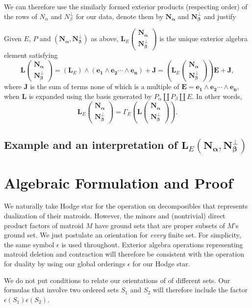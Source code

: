 \documentclass[Unicode]{cedram-alco}
\newcommand{\ext}[1]{\ensuremath{\mathbf{#1}}}
\newcommand{\dunion}{\coprod}
\newcommand{\extLVert}[2]{\ext{L}\left( \begin{array}{c} {#1}\\ {#2} \end{array} \right)}
\newcommand{\extLVertSub}[3]{\ext{L}_{#1}\left( \begin{array}{c} {#2}\\ {#3} \end{array} \right)}
\begin{document}
We can therefore use the similarly formed exterior products
(respecting order) of the rows of $N_\alpha$ and $N_\beta^\perp$
for our data, denote them by 
$\ext{N_\alpha}$ and $\ext{N_\beta^\perp}$
and justify

\begin{defi}
  Given $E$, $P$ and $(\ext{N_\alpha},\ext{N_\beta^\perp})$ as above,
  $\extLVertSub{E}{\ext{N_\alpha}}{\ext{N_\beta^\perp}}$ is the
  unique exterior algebra element satisfying
  \[
  \extLVert{\ext{N_\alpha}}{\ext{N_\beta^\perp}}=
  (\ext{L}_E)\wedge (\ext{e_1}\wedge\ext{e_2}\cdots\wedge\ext{e_n}) + \ext{J} =
  (\extLVertSub{E}{\ext{N_\alpha}}{\ext{N_\beta^\perp}})\ext{E}+\ext{J},
  \]
where $\ext{J}$ is the sum of terms none of which is a multiple of
$\ext{E}=\ext{e_1}\wedge\ext{e_2}\cdots\wedge\ext{e_n}$, when
$\ext{L}$ is expanded using the basis generated by $P_\alpha \dunion
P_\beta \dunion E$.  In other words,
  \[ 
  \extLVertSub{E}
              {\ext{N_\alpha}}
              {\ext{N_\beta^\perp}}
              =
              \Gamma_E(
              \extLVert{\ext{N_\alpha}}{\ext{N_\beta^\perp}}).
  \]
\end{defi}


\subsection{Example and an interpretation of $\ext{L}_E(\ext{N_\alpha},\ext{N_\beta^\perp})$}\label{ExamK4}






\section{Algebraic Formulation and Proof}

We naturally take Hodge star for the operation on
decomposibles that represents dualization of their
matroids.
However, the minors and
(nontrivial) direct product factors of matroid $M$
have ground sets that are proper subsets of $M$'s ground set.
We just postulate an orientation for \emph{every} finite set.
For simplicity, the same symbol $\epsilon$ is used throughout.
Exterior algebra operations
representing matroid deletion and contraction will therefore
be consistent with the operation for duality by using our
global orderings $\epsilon$ for our Hodge star.

We do not put conditions to relate our orientations of
of different sets.  Our formulas that involve two ordered sets $S_1$
and $S_2$ will therefore include the factor $\epsilon(S_1)\epsilon(S_2)$.
\end{document}
